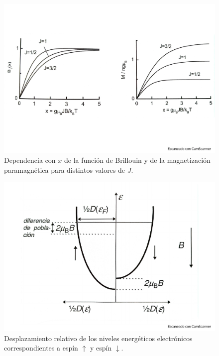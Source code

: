 \begin{figure}[h!] \centering
	\includegraphics[scale=0.35]{Cuerpo/Ch_10/Fotos libro 2.pdf}
	\caption{Dependencia con $x$ de la función de Brillouin y de la magnetización paramagnética para distintos valores de $J$.}
	\label{Fig:10-02}
\end{figure}
\begin{figure}[h!] \centering
	\includegraphics[scale=0.35]{Cuerpo/Ch_10/Fotos libro 3.pdf}
	\caption{Desplazamiento relativo de los niveles energéticos electrónicos correspondientes a espín $\uparrow$ y espín $\downarrow$.}
	\label{Fig:10-03}
\end{figure}
